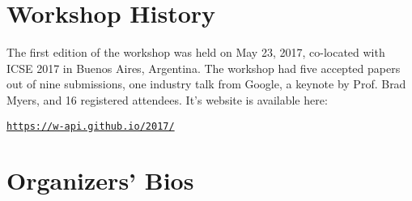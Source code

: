 \documentclass[10pt, conference]{IEEEtran}
\newcommand{\updated}[1]{#1}
\begin{document}
\section{Workshop History}

\updated{The first edition of the workshop was held on May 23, 2017, co-located with ICSE 2017 in Buenos Aires, Argentina. The workshop had five accepted papers out of nine submissions, one industry talk from Google, a keynote by Prof. Brad Myers, and 16 registered attendees. It's website is available here:}

\begin{center}
  \texttt{\url{https://w-api.github.io/2017/}}
\end{center}

\section{Organizers' Bios}
\end{document}
